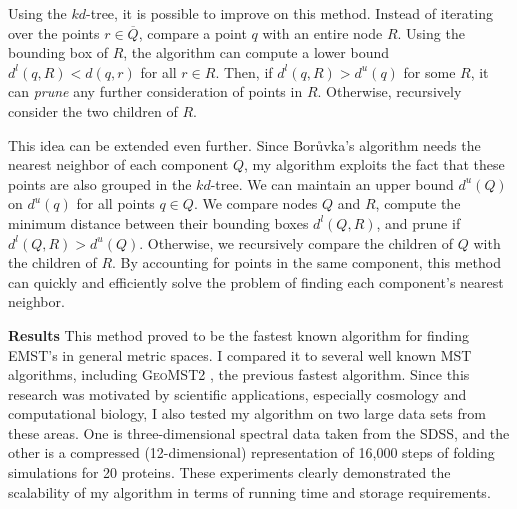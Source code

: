 \documentclass[twoside,leqno, 12pt]{article}
\begin{document}
Using the $kd$-tree, it is possible to improve on this method.  Instead of iterating over the points $r \in \overline{Q}$, compare a point $q$ with an entire node $R$.  Using the bounding box of $R$, the algorithm can compute a lower bound $d^l(q, R) < d(q, r)$ for all $r \in R$.  Then, if $d^l(q, R) > d^u(q)$ for some $R$, it can \emph{prune} any further consideration of points in $R$.  Otherwise, recursively consider the two children of $R$.

This idea can be extended even further.  Since Bor\r{u}vka's algorithm needs the nearest neighbor of each component $Q$, my algorithm exploits the fact that these points are also grouped in the $kd$-tree.  We can maintain an upper bound $d^u(Q)$ on $d^u(q)$ for all points $q \in Q$.  We compare nodes $Q$ and $R$, compute the minimum distance between their bounding boxes $d^l(Q,R)$, and prune if $d^l(Q, R) > d^u(Q)$.  Otherwise, we recursively compare the children of $Q$ with the children of $R$.  By accounting for points in the same component, this method can quickly and efficiently solve the problem of finding each component's nearest neighbor.  

\begin{figure}[tb]
\begin{center}
\vspace{-0.5in}
\label{runtimes}
\end{center}
\end{figure}


\textbf{Results}
This method proved to be the fastest known algorithm for finding EMST's in general metric spaces.  I compared it to several well known MST algorithms, including \textsc{GeoMST2} \cite{narzhuzac:00}, the previous fastest algorithm.  Since this research was motivated by scientific applications, especially cosmology and computational biology, I also tested my algorithm on two large data sets from these areas.  One is three-dimensional spectral data taken from the SDSS, and the other is a compressed (12-dimensional) representation of 16,000 steps of folding simulations for 20 proteins.  These experiments clearly demonstrated the scalability of my algorithm in terms of running time and storage requirements.
\end{document}
